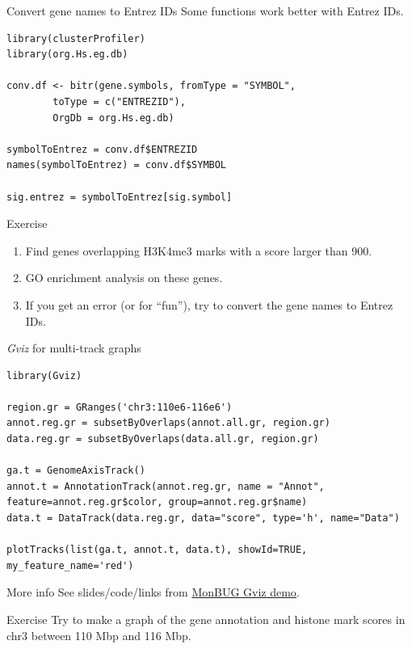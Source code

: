 \documentclass[10pt]{beamer}
\begin{document}
\begin{frame}[fragile]{Convert gene names to Entrez IDs}
  Some functions work better with Entrez IDs.
  \bigskip
  
  \begin{block}{}
\begin{lstlisting}
library(clusterProfiler)
library(org.Hs.eg.db)

conv.df <- bitr(gene.symbols, fromType = "SYMBOL",
        toType = c("ENTREZID"),
        OrgDb = org.Hs.eg.db)

symbolToEntrez = conv.df$ENTREZID
names(symbolToEntrez) = conv.df$SYMBOL

sig.entrez = symbolToEntrez[sig.symbol]
\end{lstlisting}
  \end{block}
\end{frame}

\begin{frame}[fragile]{Exercise}
  \begin{enumerate}
  \item Find genes overlapping H3K4me3 marks with a score larger than 900.
  \item GO enrichment analysis on these genes.
    \bigskip
  \item If you get an error (or for ``fun''), try to convert the gene names to Entrez IDs.
  \end{enumerate}
\end{frame}

\begin{frame}[fragile]{{\it Gviz} for multi-track graphs}
  \begin{block}{}
  \begin{lstlisting}
library(Gviz)

region.gr = GRanges('chr3:110e6-116e6')
annot.reg.gr = subsetByOverlaps(annot.all.gr, region.gr)
data.reg.gr = subsetByOverlaps(data.all.gr, region.gr)

ga.t = GenomeAxisTrack()
annot.t = AnnotationTrack(annot.reg.gr, name = "Annot", feature=annot.reg.gr$color, group=annot.reg.gr$name)
data.t = DataTrack(data.reg.gr, data="score", type='h', name="Data")

plotTracks(list(ga.t, annot.t, data.t), showId=TRUE, my_feature_name='red')
  \end{lstlisting}

  \end{block}

  \begin{block}{More info}
    See slides/code/links from \href{https://github.com/jmonlong/MonBUG17_Gviz}{MonBUG Gviz demo}.
  \end{block}

  \begin{alertblock}{Exercise}
    Try to make a graph of the gene annotation and histone mark scores in chr3 between 110 Mbp and 116 Mbp.
  \end{alertblock}

\end{frame}
\end{document}
